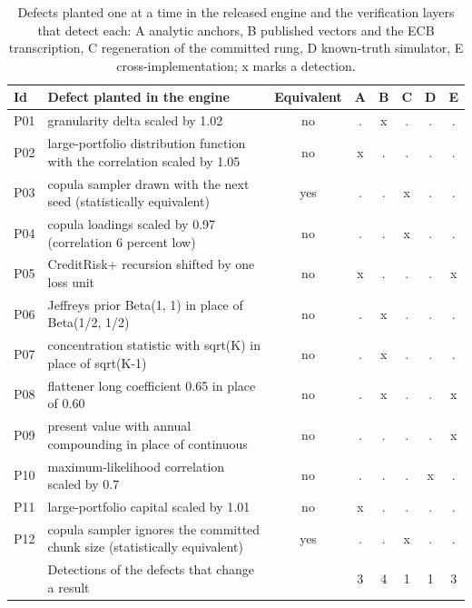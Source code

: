 \begin{table}[htbp]
\centering
\small
\caption{Defects planted one at a time in the released engine and the verification layers that detect each: A analytic anchors, B published vectors and the ECB transcription, C regeneration of the committed rung, D known-truth simulator, E cross-implementation; x marks a detection.}
\label{tab:ablation}
\begin{tabular}{lp{6.4cm}cccccc}
\toprule
Id & Defect planted in the engine & Equivalent & A & B & C & D & E \\
\midrule
P01 & granularity delta scaled by 1.02 & no & . & x & . & . & . \\
P02 & large-portfolio distribution function with the correlation scaled by 1.05 & no & x & . & . & . & . \\
P03 & copula sampler drawn with the next seed (statistically equivalent) & yes & . & . & x & . & . \\
P04 & copula loadings scaled by 0.97 (correlation 6 percent low) & no & . & . & x & . & . \\
P05 & CreditRisk+ recursion shifted by one loss unit & no & x & . & . & . & x \\
P06 & Jeffreys prior Beta(1, 1) in place of Beta(1/2, 1/2) & no & . & x & . & . & . \\
P07 & concentration statistic with sqrt(K) in place of sqrt(K-1) & no & . & x & . & . & . \\
P08 & flattener long coefficient 0.65 in place of 0.60 & no & . & x & . & . & x \\
P09 & present value with annual compounding in place of continuous & no & . & . & . & . & x \\
P10 & maximum-likelihood correlation scaled by 0.7 & no & . & . & . & x & . \\
P11 & large-portfolio capital scaled by 1.01 & no & x & . & . & . & . \\
P12 & copula sampler ignores the committed chunk size (statistically equivalent) & yes & . & . & x & . & . \\
 & Detections of the defects that change a result &  & 3 & 4 & 1 & 1 & 3 \\
\bottomrule
\end{tabular}
\end{table}

